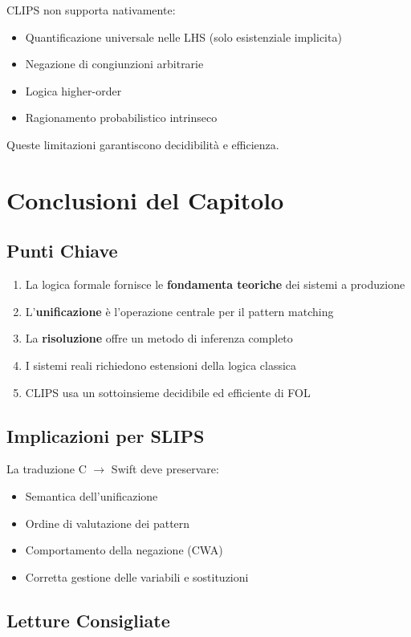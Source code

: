 CLIPS non supporta nativamente:
\begin{itemize}
\item Quantificazione universale nelle LHS (solo esistenziale implicita)
\item Negazione di congiunzioni arbitrarie
\item Logica higher-order
\item Ragionamento probabilistico intrinseco
\end{itemize}

Queste limitazioni garantiscono decidibilità e efficienza.

\section{Conclusioni del Capitolo}

\subsection{Punti Chiave}

\begin{enumerate}
\item La logica formale fornisce le \textbf{fondamenta teoriche} dei sistemi a produzione
\item L'\textbf{unificazione} è l'operazione centrale per il pattern matching
\item La \textbf{risoluzione} offre un metodo di inferenza completo
\item I sistemi reali richiedono estensioni della logica classica
\item CLIPS usa un sottoinsieme decidibile ed efficiente di FOL
\end{enumerate}

\subsection{Implicazioni per SLIPS}

La traduzione C $\rightarrow$ Swift deve preservare:
\begin{itemize}
\item Semantica dell'unificazione
\item Ordine di valutazione dei pattern
\item Comportamento della negazione (CWA)
\item Corretta gestione delle variabili e sostituzioni
\end{itemize}

\subsection{Letture Consigliate}

